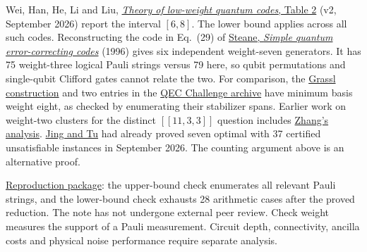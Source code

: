 \documentclass[11pt]{article}
\begin{document}
Wei, Han, He, Li and Liu, \href{https://arxiv.org/html/2601.19848v2\#S7.T2}{\emph{Theory of low-weight quantum codes}, Table 2} (v2, September 2026) report the interval $[6,8]$. The lower bound applies across all such codes. Reconstructing the code in Eq.~(29) of \href{https://arxiv.org/abs/quant-ph/9605021}{Steane, \emph{Simple quantum error-correcting codes}} (1996) gives six independent weight-seven generators. It has 75 weight-three logical Pauli strings versus 79 here, so qubit permutations and single-qubit Clifford gates cannot relate the two. For comparison, the \href{https://codetables.de/QECC.php?q=4\&n=11\&k=5}{Grassl construction} and two entries in the \href{https://qecchallenge.com/codes/11-5-3.html}{QEC Challenge archive} have minimum basis weight eight, as checked by enumerating their stabilizer spans. Earlier work on weight-two clusters for the distinct $[[11,3,3]]$ question includes \href{https://yuxuanzhang1995.github.io/agentic-research/lowweight-11-3-3/}{Zhang's analysis}. \href{https://github.com/Ivann1242/optimal-check-weight-11-3-3/blob/b4df2d2a2a855f89f9aa9d7200a6f5582519e1fb/paper/main.tex}{Jing and Tu} had already proved seven optimal with 37 certified unsatisfiable instances in September 2026. The counting argument above is an alternative proof.

\href{https://github.com/shunyaekam/oo-research/tree/research/checks/small_qec}{Reproduction package}: the upper-bound check enumerates all relevant Pauli strings, and the lower-bound check exhausts 28 arithmetic cases after the proved reduction. The note has not undergone external peer review. Check weight measures the support of a Pauli measurement. Circuit depth, connectivity, ancilla costs and physical noise performance require separate analysis.
\end{document}
